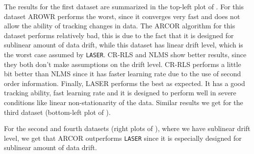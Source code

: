 The results for the first dataset are summarized in the top-left plot of
.
For this dataset
AROWR performs the worst, since it converges very fast and does not
allow the ability of tracking changes in data. The ARCOR algorithm for
this dataset performs relatively bad, this is due to the fact that it
is designed for sublinear amount of data drift, while this dataset has
linear drift level, which is the worst case assumed by \texttt{LASER}. CR-RLS
and NLMS show better results, since they both don't make assumptions
on the drift level. CR-RLS performs a little bit better than NLMS
since it has faster learning rate due to the use of second order
information. Finally, LASER %
performs the best as expected. It has a good tracking ability, fast learning rate and it is designed to perform well in severe conditions like linear non-stationarity of the data. %
Similar results we get for the third dataset (bottom-left plot of ).

For the second and fourth datasets (right plots of
), where we have sublinear drift level, we get that ARCOR
outperforms \texttt{LASER} since it is especially designed for sublinear amount
of data drift.%





